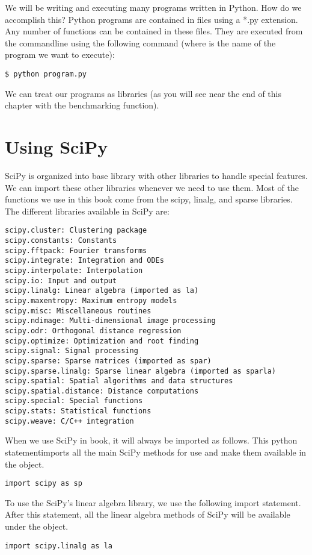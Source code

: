We will be writing and executing many programs written in Python.  How do we accomplish this?  Python programs are contained in files using a *.py extension.  Any number of functions can be contained in these files.  They are executed from the commandline using the following command (where  is the name of the program we want to execute):
\begin{lstlisting}
$ python program.py
\end{lstlisting}

We can treat our programs as libraries (as you will see near the end of this chapter with the benchmarking function).

\section*{Using SciPy}
SciPy is organized into base library with other libraries to handle special features.  We can import these other libraries whenever we need to use them.  Most of the functions we use in this book come from the scipy, linalg, and sparse libraries. The different libraries available in SciPy are:
\begin{lstlisting}
scipy.cluster: Clustering package
scipy.constants: Constants
scipy.fftpack: Fourier transforms
scipy.integrate: Integration and ODEs
scipy.interpolate: Interpolation
scipy.io: Input and output
scipy.linalg: Linear algebra (imported as la)
scipy.maxentropy: Maximum entropy models
scipy.misc: Miscellaneous routines
scipy.ndimage: Multi-dimensional image processing
scipy.odr: Orthogonal distance regression
scipy.optimize: Optimization and root finding
scipy.signal: Signal processing
scipy.sparse: Sparse matrices (imported as spar)
scipy.sparse.linalg: Sparse linear algebra (imported as sparla)
scipy.spatial: Spatial algorithms and data structures
scipy.spatial.distance: Distance computations
scipy.special: Special functions
scipy.stats: Statistical functions
scipy.weave: C/C++ integration
\end{lstlisting}

When we use SciPy in book, it will always be imported as follows. This python statementimports all the main SciPy methods for use and make them available in the  object.
\begin{lstlisting}
import scipy as sp
\end{lstlisting}

To use the SciPy's linear algebra library, we use the following import statement.  After this statement, all the linear algebra methods of SciPy will be available under the  object.
\begin{lstlisting}
import scipy.linalg as la
\end{lstlisting}

